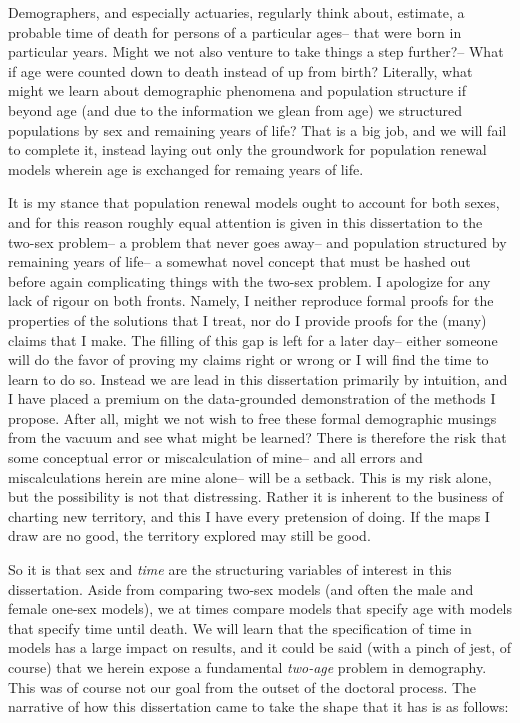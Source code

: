 Demographers, and especially actuaries, regularly think about, estimate, a
probable time of death for persons of a particular ages-- that were born in
particular years. Might we not also venture to take things a step further?--
What if age were counted down to death instead of up
from birth? Literally, what might we learn about demographic phenomena and
population structure if beyond age (and due to the information we glean from
age) we structured populations by sex and remaining years of life? That is a 
big job, and we will fail to complete it, instead laying out only the groundwork
for population renewal models wherein age is exchanged for remaing years of life.

It is my stance that population renewal models ought to account for both sexes,
and for this reason roughly equal attention is given in this dissertation to the
two-sex problem-- a problem that never goes away-- and population structured
by remaining years of life-- a somewhat novel concept that must be hashed out
before again complicating things with the two-sex problem. I apologize for any lack of
rigour on both fronts. Namely, I neither reproduce formal proofs for the
properties of the solutions that I treat, nor do I provide proofs for the
(many) claims that I make. The filling of this gap is left for a later day--
either someone will do the favor of proving my claims right or wrong or I
will find the time to learn to do so. Instead we are lead in this dissertation
primarily by intuition, and I have placed a premium on the
data-grounded demonstration of the methods I propose. After all, might we not
wish to free these formal demographic musings from the vacuum and see what might
be learned? There is therefore the risk that some conceptual error or
miscalculation of mine-- and all errors and miscalculations herein are mine
alone-- will be a setback. This is my risk alone, but the possibility is
not that distressing. Rather it is inherent to the business of charting new
territory, and this I have every pretension of doing. If the maps I draw are no
good, the territory explored may still be good.

So it is that sex and \textit{time} are the structuring variables of
interest in this dissertation. Aside from comparing two-sex models (and often the male
and female one-sex models), we at times compare models that
specify age with models that specify time until death. We will learn that the
specification of time in models has a large impact on results, and it could
be said (with a pinch of jest, of course) that we herein expose a
fundamental \textit{two-age} problem in demography. This was of course not our goal from the
outset of the doctoral process. The narrative of how this dissertation came to
take the shape that it has is as follows:

